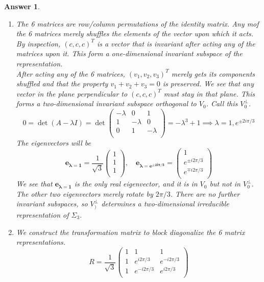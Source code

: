 \documentclass[a4paper]{article}
\DeclareMathOperator{\Id}{Id}
\newtheorem{ans}{Answer}[section]
\theoremstyle{new}
\begin{document}
\begin{ans}
\begin{enumerate}[label=(\roman*)]
$${{    (1)(23) & (1)(23) &(12)(3) & (13)(2) & (132) &(123) &\Id \cr
}}$$
The conjugacy classes of $\Sigma_3$ are
$$\{\Id\},\quad\{(123),(132)\},\quad\{(13)(2),(12)(3),(1)(23)\}$$
\item The 6 matrices are row/column permutations of the identity matrix. Any mof the 6 matrices merely shuffles the elements of the vector upon which it acts. By inspection, $(c,c,c)^T$ is a vector that is invariant after acting any of the matrices upon it. This form a one-dimensional invariant subspace of the representation.\\[5pt]
After acting any of the 6 matrices, $(v_1,v_2,v_3)^T$ merely gets its components shuffled and that the property $v_1+v_2+v_3=0$ is preserved. We see that any vector in the plane perpendicular to $(c,c,c)^T$ must stay in that plane. This forms a two-dimensional invariant subspace orthogonal to $V_0$. Call this $V_0^\perp$.
$$0=\det(A-\lambda I)=\det\begin{pmatrix}-\lambda&0&1\\1&-\lambda&0\\0&1&-\lambda\\\end{pmatrix}=-\lambda^3+1\implies\lambda=1,e^{\pm 2i\pi/3}$$
The eigenvectors will be
$$\mathbf{e_{\lambda=1}}=\frac{1}{\sqrt{3}}\begin{pmatrix}1\\1\\1\\\end{pmatrix},\quad\boldsymbol{e_{\lambda=e^{\pm2i\pi/3}}}=\begin{pmatrix}1\\e^{\pm i2\pi/3}\\e^{\mp i2\pi/3}\\\end{pmatrix}$$
We see that $\mathbf{e_{\lambda=1}}$ is the only real eigenvector, and it is in $V_0$ but not in $V_0^\perp$. The other two eigenvectors merely rotate by $2\pi/3$. There are no further invariant subspaces, so $V_)^\perp$ determines a two-dimensional irreducible representation of $\Sigma_3$.
\item We construct the transformation matrix to block diagonalize the 6 matrix representations.
$$R=\frac{1}{\sqrt{3}}\begin{pmatrix}1&1&1\\1&e^{i2\pi/3}&e^{-i2\pi/3}\\1&e^{-i2\pi/3}&e^{i2\pi/3}\\\end{pmatrix}$$

\end{enumerate}
\end{ans}
\end{document}
